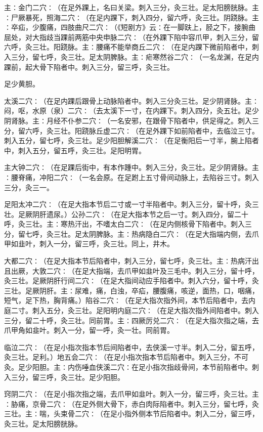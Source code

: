 \documentclass[a4paper,12pt,UTF8,twoside]{ctexbook}
\begin{document}
主∶金门二穴∶（在足外踝上，名曰关梁。刺入三分，灸三壮。足太阳膀胱脉。主∶尸厥暴死，照海二穴∶（在足内踝下，刺入四分，留六呼，灸三壮。阴跷脉。主∶卒疝，少腹痛，四肢曲尺二穴∶（《短剧方》云∶在一脚趺上，胫之下，接腕曲屈处，对大指歧当踝前两筋中央申脉二穴∶（在外踝下陷中容爪甲，刺入三分，留六呼，灸三壮。阳跷脉。主∶腰痛不能举商丘二穴∶（在足内踝下微前陷者中，刺入三分，留七呼，灸三壮。足太阴脾脉。主∶疟寒然谷二穴∶（一名龙渊，在足内踝前，起大骨下陷者中。刺入三分，留三呼，灸三壮。

足少黄胆。

太溪二穴∶（在足内踝后跟骨上动脉陷者中。刺入三分灸三壮。足少阴肾脉。主∶闷，呕，水原（泉）二穴∶（去太溪下一寸，在内踝下。刺入四分，灸五壮。足少阴肾脉。主∶月经不仆参二穴∶（一名安邪，在跟骨下陷者中，供足得之。刺入三分，留六呼，灸三壮。阳跷脉丘虚二穴∶（在足外踝下如前陷者中，去临泣三寸。刺入五分，留七呼，灸三壮。足少阳胆解溪二穴∶（在足衡阳后一寸半，腕上陷者中，刺入五分，留五呼，灸三壮。足阳明胃。

主大钟二穴∶（在足踝后街中，有本作踵中。刺入三分，灸三壮。足少阴肾脉。主∶腰脊痛，冲阳二穴∶（一名会原。在足跗上五寸骨间动脉上，去陷谷三寸。刺入三分，灸三一。

足阳太冲二穴∶（在足大指本节后二寸或一寸半陷者中。刺入三分，留十呼，灸三壮。足厥阴肝遗尿。）公孙二穴∶（在足大指本节之后一寸。刺入四分，留二十呼，灸三壮。主∶寒热汗出，不嗜太白二穴∶（在足内侧核骨下陷者中。刺入三分，留七呼，灸三壮。足太阴脾脉。主∶热病隐白二穴∶（在足大指端内侧，去爪甲如韭叶，刺入一分，留三呼，灸三壮。同上，井木。

大都二穴∶（在足大指本节后陷者中，刺入三分，留七呼，灸三壮。主∶热病汗出且出厥，大敦二穴∶（在足大指端，去爪甲如韭叶及三毛中。刺入三分，留十呼，灸三壮。足厥阴肝行间二穴∶（在足大指间动应手陷者中。刺入六分，留十呼，灸三壮。足厥阴肝。主∶尿难，痛，白浊，卒疝，腰腹痛，咳逆，面热，口，咽痛，短气，足下热，胸背痛。）陷谷二穴∶（在足大指次指外间，本节后陷者中，去内庭二寸。刺入五分，灸三壮。足阳明内庭二穴∶（在足大指次指外间陷者中。刺入三分，留二十呼，灸三壮。同前胃。主∶四厥厉兑二穴∶（在足大指次指之端，去爪甲角如韭叶。刺入一分，留一呼，灸一壮。同前胃。

临泣二穴∶（在足小指次指本节后间陷者中，去侠溪一寸半。刺入二分，留五呼，灸三壮。足利。）地五会二穴∶（在足小指次指本节后陷者中。刺入三分，不可灸。足少阳胆。主∶内伤唾血侠溪二穴∶在足小指次指歧骨间，本节前陷者中。刺入三分，留三呼，灸三壮。足少阳胆。

窍阴二穴∶（在足小指次指之端，去爪甲如韭叶。刺入一分，留三呼，灸三壮。主∶胁痛，京骨二穴∶（在足外侧大骨下，赤白肉际陷者中。刺入三分，留七呼，灸三壮。主∶喘，头束骨二穴∶（在足小指外侧本节后陷者中。刺入二分，留三呼，灸三壮。足太阳膀胱脉。
\end{document}
